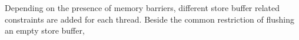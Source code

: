 \noindent
%
Depending on the presence of memory barriers, different store buffer related constraints are added for each thread.
Beside the common restriction of flushing an empty store buffer, %
